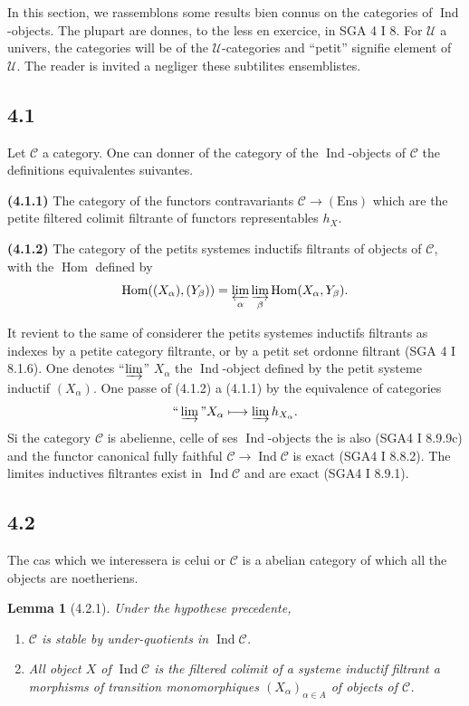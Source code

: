 \documentclass[12pt,a4paper]{article}
\theoremstyle{plain}
\newtheorem{lemma}[theorem]{Lemma}
\theoremstyle{definition}
\theoremstyle{remark}
\DeclareMathOperator{\Hom}{Hom}
\DeclareMathOperator{\Ind}{Ind}
\providecommand{\Hom}{\operatorname{Hom}}
\providecommand{\limind}{\varinjlim}
\providecommand{\limproj}{\varprojlim}
\begin{document}
In this section, we rassemblons some results bien connus on the
categories of $\Ind$-objects. The plupart are donnes, to the less en exercice, in
SGA 4 I 8. For $\mathcal{U}$ a univers, the categories will be of the
$\mathcal{U}$-categories and ``petit'' signifie element of $\mathcal{U}$. The reader is invited a negliger these subtilites ensemblistes.

\subsection*{4.1}

Let $\mathcal{C}$ a category. One can donner of the category of the
$\Ind$-objects of $\mathcal{C}$ the definitions equivalentes suivantes.

\textbf{(4.1.1)} The category of the functors contravariants $\mathcal{C} \to
(\text{Ens})$ which are the petite filtered colimit filtrante of functors representables
$h_X$.

\textbf{(4.1.2)} The category of the petits systemes inductifs filtrants of objects of
$\mathcal{C}$, with the $\Hom$ defined by
\begin{equation}\label{eq:4.1.3}
\Hom((X_\alpha), (Y_\beta)) = \limproj_\alpha \limind_\beta \Hom(X_\alpha, Y_\beta).
\end{equation}

It revient to the same of considerer the petits systemes inductifs filtrants as
indexes by a petite category filtrante, or by a petit set ordonne filtrant
(SGA 4 I 8.1.6). One denotes ``$\limind$'' $X_\alpha$ the $\Ind$-object defined by the petit
systeme inductif $(X_\alpha)$. One passe of (4.1.2) a (4.1.1) by the equivalence of
categories
\[
\text{``}\limind\text{''} X_\alpha \longmapsto \limind h_{X_\alpha}.
\]
Si the category $\mathcal{C}$ is abelienne, celle of ses $\Ind$-objects the is also
(SGA4 I 8.9.9c) and the functor canonical fully faithful $\mathcal{C} \to
\Ind\mathcal{C}$ is exact (SGA4 I 8.8.2). The limites inductives filtrantes exist
in $\Ind\mathcal{C}$ and are exact (SGA4 I 8.9.1).

\subsection*{4.2}

The cas which we interessera is celui or $\mathcal{C}$ is a abelian category
of which all the objects are noetheriens.

\begin{lemma}[4.2.1]\label{lem:4.2.1}
Under the hypothese precedente,
\begin{enumerate}[label=(\roman*)]
\item $\mathcal{C}$ is stable by under-quotients in $\Ind\mathcal{C}$.
\item All object $X$ of $\Ind\mathcal{C}$ is the filtered colimit of a systeme inductif
filtrant a morphisms of transition monomorphiques $(X_\alpha)_{\alpha \in A}$ of objects of
$\mathcal{C}$.
\end{enumerate}
\end{lemma}
\end{document}

